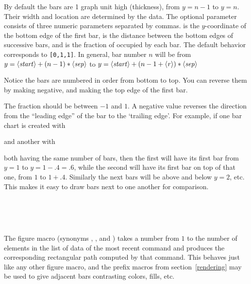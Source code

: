 \documentclass[letterpaper]{article}
\begin{document}
By default the bars are 1 graph unit high (thickness), from $y = n-1$ to
$y = n$. Their width and location are determined by the data. The
optional parameter consists of three numeric parameters separated by
commas.  is the $y$-coordinate of the bottom edge of the
first bar,  is the distance between the  bottom edges of
successive bars, and  is the fraction of  occupied by
each bar. The default behavior corresponds to \texttt{[0,1,1]}. In
general, bar number $n$ will be from $y = \langle\mbox{\rmfamily\itshape start\/}\rangle +
(n-1)*\langle\mbox{\rmfamily\itshape sep\/}\rangle$ to $y = \langle\mbox{\rmfamily\itshape start\/}\rangle + (n-1 + \langle\mbox{\rmfamily\itshape r\/}\rangle)*\langle\mbox{\rmfamily\itshape sep\/}\rangle$

Notice the bars are numbered in order from bottom to top. You can
reverse them by making  negative, and making  the
top edge of the first bar.

The fraction   should be between $-1$ and $1$. A negative value
reverses the direction from the ``leading edge'' of the bar to the
`trailing edge'. For example, if one bar chart is created with
\begin{ex}
  \marg{$\ldots$}
\end{ex}
and another with
\begin{ex}
  \marg{$\ldots$}
\end{ex}
both having the same number of bars, then the first will have its first
bar from $y = 1$ to $y = 1 -.4 = .6$, while the second will have its
first bar on top of that one, from $1$ to $1 + .4$. Similarly the next
bars will be above and below $y=2$, etc. This makes it easy to draw bars
next to one another for comparison.

\begin{cd}
\\
\\
\\
%
%
%
%
%
\end{cd}

The figure macro  (synonyms , ,
and ) takes a number from $1$ to the number of elements in
the list of data of the most recent  command and produces
the corresponding rectangular path computed by that command. This
behaves just like any other figure macro, and the prefix macros from
section~\ref{rendering} may be used to give adjacent bars contrasting
colors, fills, etc.
\end{document}
